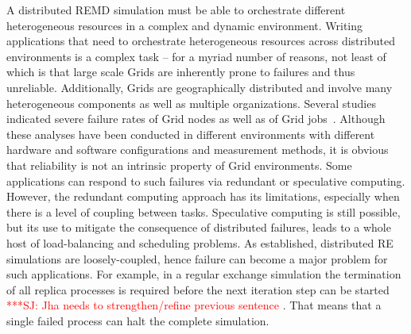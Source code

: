 \documentclass[times, 10pt,twocolumn]{article}
\newcommand{\kimnote}[1]{ {\textcolor{green} { ***JK: #1 }}}
\newcommand{\jhanote}[1]{ {\textcolor{red} { ***SJ: #1 }}}
\newcommand{\kimnote}[1]{}
\newcommand{\jhanote}[1]{}
\begin{document}
  

              

A distributed REMD simulation must be able to orchestrate different
heterogeneous resources in a complex and dynamic environment.  Writing
applications that need to orchestrate heterogeneous resources across
distributed environments is a complex task -- for a myriad number of
reasons, not least of which is that large scale Grids are inherently
prone to failures and thus unreliable.  Additionally, Grids are
geographically distributed and involve many heterogeneous components
as well as multiple organizations.  Several studies indicated severe
failure rates of Grid nodes as well as of Grid
jobs~\cite{schroeder,10.1109/E-SCIENCE.2006.93,DBLP:conf/grid/KhaliliHOSC06}.
Although these analyses have been conducted in different environments
with different hardware and software configurations and measurement
methods, it is obvious that reliability is not an intrinsic property
of Grid environments. Some applications can respond to such failures
via redundant or speculative computing.  However, the redundant
computing approach has its limitations, especially when there is a
level of coupling between tasks.  Speculative computing is still
possible, but its use to mitigate the consequence of distributed
failures, leads to a whole host of load-balancing and scheduling
problems.  As established, distributed RE simulations are
loosely-coupled, hence failure can become a major problem for such
applications.  For example, in a regular exchange simulation the
termination of all replica processes is required before the next
iteration step can be started \jhanote{Jha needs to strengthen/refine
  previous sentence}. That means that a single failed process can halt
the complete simulation.
\end{document}
